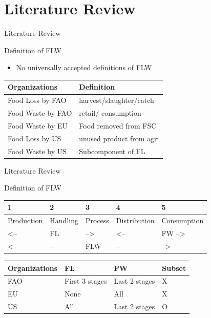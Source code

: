 \documentclass[
  ignorenonframetext,
]{beamer}
\providecommand{\tightlist}{%
  \setlength{\itemsep}{0pt}\setlength{\parskip}{0pt}}
\begin{document}
\hypertarget{literature-review}{%
\section{Literature Review}\label{literature-review}}

\begin{frame}{Literature Review}
\protect\hypertarget{literature-review-1}{}
\begin{block}{Definition of FLW}
\protect\hypertarget{definition-of-flw}{}
\begin{itemize}
\tightlist
\item
  No universally accepted definitions of FLW
\end{itemize}

\begin{longtable}[]{@{}ll@{}}
\toprule()
Organizations & Definition \\
\midrule()
\endhead
Food Loss by FAO & harvest/slaughter/catch \\
Food Waste by FAO & retail/ consumption \\
Food Waste by EU & Food removed from FSC \\
Food Loss by US & unused product from agri \\
Food Waste by US & Subcomponent of FL \\
\bottomrule()
\end{longtable}
\end{block}
\end{frame}

\begin{frame}{Literature Review}
\protect\hypertarget{literature-review-2}{}
\begin{block}{Definition of FLW}
\protect\hypertarget{definition-of-flw-1}{}
\begin{longtable}[]{@{}lllll@{}}
\toprule()
1 & 2 & 3 & 4 & 5 \\
\midrule()
\endhead
Production & Handling & Process & Distribution & Consumption \\
\textless-- & FL & --\textgreater{} & \textless-- & FW
--\textgreater{} \\
\textless-- & -- & FLW & -- & --\textgreater{} \\
\bottomrule()
\end{longtable}

\begin{longtable}[]{@{}llll@{}}
\toprule()
Organizations & FL & FW & Subset \\
\midrule()
\endhead
FAO & First 3 stages & Last 2 stages & X \\
EU & None & All & X \\
US & All & Last 2 stages & O \\
\bottomrule()
\end{longtable}
\end{block}
\end{frame}
\end{document}

